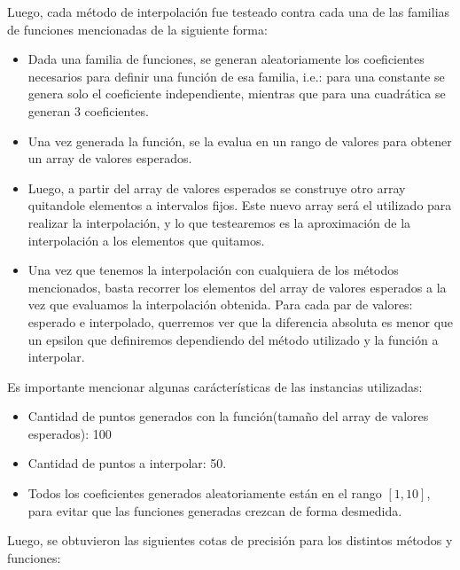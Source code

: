 Luego, cada método de interpolación fue testeado contra cada una de las familias de funciones mencionadas de la siguiente forma:
\begin{itemize}
  \item Dada una familia de funciones, se generan aleatoriamente los coeficientes necesarios para definir una función de esa familia, i.e.: para una constante se genera solo el coeficiente independiente, mientras que para una cuadrática se generan 3 coeficientes.
    \item Una vez generada la función, se la evalua en un rango de valores para obtener un array de valores esperados.
    \item Luego, a partir del array de valores esperados se construye otro array quitandole elementos a intervalos fijos.
        Este nuevo array será el utilizado para realizar la interpolación, y lo que testearemos es la aproximación de  la
        interpolación a los elementos que quitamos.
    \item Una vez que tenemos la interpolación con cualquiera de los métodos mencionados, basta recorrer los elementos del array de valores esperados a la vez que evaluamos la interpolación obtenida.
        Para cada par de valores: esperado e interpolado, querremos ver que la diferencia absoluta es menor que un epsilon que
        definiremos dependiendo del método utilizado y la función a interpolar.
\end{itemize}

Es importante mencionar algunas carácterísticas de las instancias utilizadas:
\begin{itemize}
    \item Cantidad de puntos generados con la función(tamaño del array de valores esperados): 100
    \item Cantidad de puntos a interpolar: 50.
    \item Todos los coeficientes generados aleatoriamente están en el rango $[1,10]$,
        para evitar que las funciones generadas crezcan de forma desmedida.
\end{itemize}

Luego, se obtuvieron las siguientes cotas de precisión para los distintos métodos y funciones:

